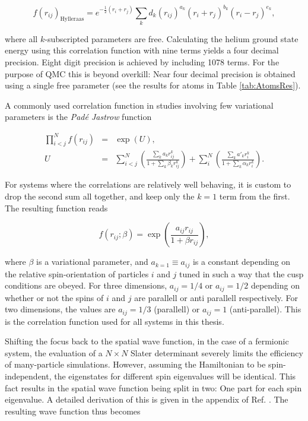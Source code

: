 \begin{equation}
 f(r_{ij})_\mathrm{Hylleraas} = e^{-\frac{1}{2} (r_i + r_j)}\sum_k d_k(r_{ij})^{a_k} (r_i + r_j)^{b_k}(r_i - r_j)^{e_k},
\end{equation}

where all $k$-subscripted parameters are free. Calculating the helium ground state energy using this correlation function with nine terms yields a four decimal precision. Eight digit precision is achieved by including 1078 terms. For the purpose of QMC this is beyond overkill: Near four decimal precision is obtained using a single free parameter (see the results for atoms in Table \ref{tab:AtomsRes}). 

A commonly used correlation function in studies involving few variational parameters is the \textit{Padé Jastrow} function

\begin{eqnarray*}
 \prod_{i<j}^Nf(r_{ij}) &=& \exp(U), \\
         U &=&  \sum_{i<j}^N\left(\frac{\sum_k a_kr_{ij}^k}{1 + \sum_k \beta_kr_{ij}^k}\right) + \sum_i^N\left(\frac{\sum_k a'_kr_i^k}{1 + \sum_k \alpha_kr_i^k}\right).
\end{eqnarray*}

For systems where the correlations are relatively well behaving, it is custom to drop the second sum all together, and keep only the $k=1$ term from the first. The resulting function reads

\begin{equation}
 \label{eq:jastrow}
 f(r_{ij}; \beta) = \exp\left(\frac{a_{ij} r_{ij}}{1 + \beta r_{ij}}\right),
\end{equation}

where $\beta$ is a variational parameter, and $a_{k=1} \equiv a_{ij}$ is a constant depending on the relative spin-orientation of particles $i$ and $j$ tuned in such a way that the cusp conditions are obeyed. For three dimensions, $a_{ij} = 1/4$ or $a_{ij} = 1/2$ depending on whether or not the spins of $i$ and $j$ are parallell or anti parallell respectively\cite{abInitioMC}. For two dimensions, the values are $a_{ij}=1/3$ (parallell) or $a_{ij}=1$ (anti-parallel)\cite{larseivind}. This is the correlation function used for all systems in this thesis.

Shifting the focus back to the spatial wave function, in the case of a fermionic system, the evaluation of a $N\times N$ Slater determinant severely limits the efficiency of many-particle simulations. However, assuming the Hamiltonian to be spin-independent, the eigenstates for different spin eigenvalues will be identical. This fact results in the spatial wave function being split in two: One part for each spin eigenvalue. A detailed derivation of this is given in the appendix of Ref. \cite{QMCPHD2008}. The resulting wave function thus becomes

